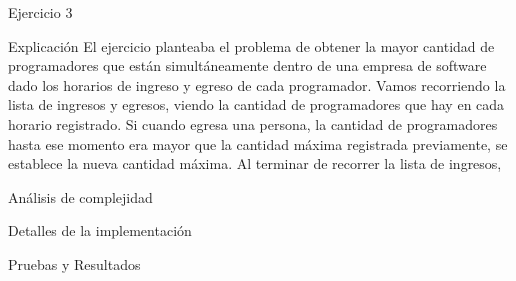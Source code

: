 \begin{section}{Ejercicio 3}
	
	\begin{subsection}{Explicación}
El ejercicio planteaba el problema de obtener la mayor cantidad de programadores que están simultáneamente dentro de una empresa de software dado los horarios de ingreso y egreso de cada programador.
Vamos recorriendo la lista de ingresos y egresos, viendo la cantidad de programadores que hay en cada horario registrado. Si cuando egresa una persona, la cantidad de programadores hasta ese momento era mayor que la cantidad máxima registrada previamente, se establece la nueva cantidad máxima. Al terminar de recorrer la lista de ingresos, 


		\begin{subsubsection}{Análisis de complejidad}
		\end{subsubsection}

	\end{subsection}

	\begin{subsection}{Detalles de la implementación}
	\end{subsection}

	\begin{subsection}{Pruebas y Resultados}			
	\end{subsection}

\end{section}







